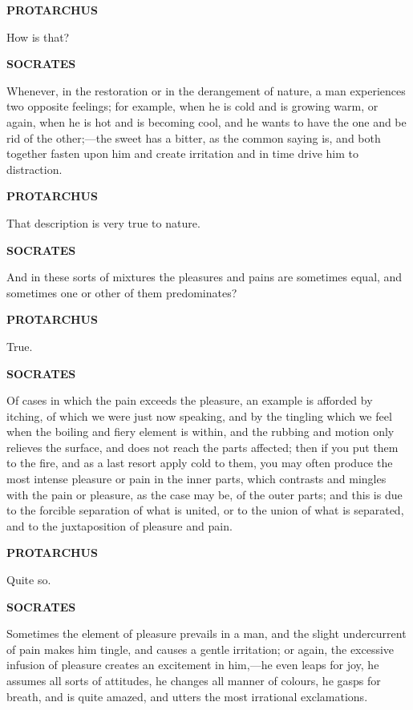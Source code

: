 \documentclass[11pt,letter]{article}
\begin{document}
\par \textbf{PROTARCHUS}
\par   How is that?

\par \textbf{SOCRATES}
\par   Whenever, in the restoration or in the derangement of nature, a man experiences two opposite feelings; for example, when he is cold and is growing warm, or again, when he is hot and is becoming cool, and he wants to have the one and be rid of the other;—the sweet has a bitter, as the common saying is, and both together fasten upon him and create irritation and in time drive him to distraction.

\par \textbf{PROTARCHUS}
\par   That description is very true to nature.

\par \textbf{SOCRATES}
\par   And in these sorts of mixtures the pleasures and pains are sometimes equal, and sometimes one or other of them predominates?

\par \textbf{PROTARCHUS}
\par   True.

\par \textbf{SOCRATES}
\par   Of cases in which the pain exceeds the pleasure, an example is afforded by itching, of which we were just now speaking, and by the tingling which we feel when the boiling and fiery element is within, and the rubbing and motion only relieves the surface, and does not reach the parts affected; then if you put them to the fire, and as a last resort apply cold to them, you may often produce the most intense pleasure or pain in the inner parts, which contrasts and mingles with the pain or pleasure, as the case may be, of the outer parts; and this is due to the forcible separation of what is united, or to the union of what is separated, and to the juxtaposition of pleasure and pain.

\par \textbf{PROTARCHUS}
\par   Quite so.

\par \textbf{SOCRATES}
\par   Sometimes the element of pleasure prevails in a man, and the slight undercurrent of pain makes him tingle, and causes a gentle irritation; or again, the excessive infusion of pleasure creates an excitement in him,—he even leaps for joy, he assumes all sorts of attitudes, he changes all manner of colours, he gasps for breath, and is quite amazed, and utters the most irrational exclamations.
\end{document}
